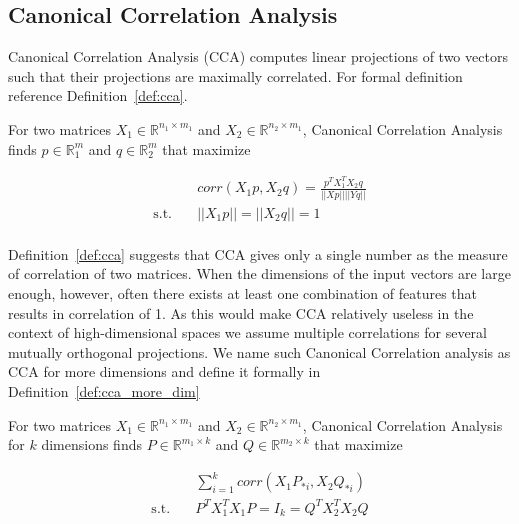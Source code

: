 \subsection{Canonical Correlation Analysis}

Canonical Correlation Analysis (CCA) computes linear projections of two vectors
such that their projections are maximally correlated. For formal definition
reference Definition~\ref{def:cca}.

\begin{defn}\label{def:cca}

  For two matrices $X_1 \in \mathbb{R}^{n_1 \times m_1}$ and $X_2 \in
  \mathbb{R}^{n_2 \times m_1}$, Canonical Correlation Analysis finds $p \in
  \mathbb{R}^m_1$ and $q \in \mathbb{R}^m_2$ that maximize

  \begin{equation}
    \begin{split}
      & corr(X_1p, X_2q) = \frac{p^TX_1^TX_2q}{||Xp|| ||Yq||} \\
      \text{s.t.}\quad &||X_1p|| = ||X_2q|| = 1 \\
    \end{split}
  \end{equation}


\end{defn}

Definition~\ref{def:cca} suggests that CCA gives only a single number as the
measure of correlation of two matrices. When the dimensions of the input vectors
are large enough, however, often there exists at least one combination of
features that results in correlation of 1. As this would make CCA relatively
useless in the context of high-dimensional spaces we assume multiple
correlations for several mutually orthogonal projections. We name such Canonical
Correlation analysis as CCA for more dimensions and define it formally in
Definition~\ref{def:cca_more_dim}

\begin{defn}\label{def:cca_more_dim}

  For two matrices $X_1 \in \mathbb{R}^{n_1 \times m_1}$ and $X_2 \in
  \mathbb{R}^{n_2 \times m_1}$, Canonical Correlation Analysis for $k$
  dimensions finds $P \in \mathbb{R}^{m_1 \times k}$ and $Q \in \mathbb{R}^{m_2
  \times k}$ that maximize

  \begin{equation}
    \begin{split}
      &\sum_{i = 1}^k corr(X_1P_{*i}, X_2Q_{*i}) \\
      \text{s.t.}\quad &P^TX_1^TX_1P = I_k = Q^TX_2^TX_2Q \\
    \end{split}
  \end{equation}


\end{defn}

